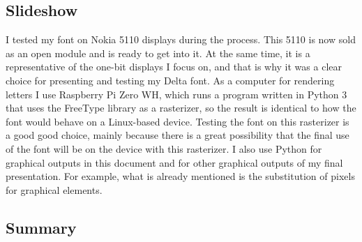 \documentclass[a4paper]{article}
\begin{document}
\subsection{Slideshow}
I tested my font on Nokia 5110 displays during the process. This 5110 is now sold as an open module and is ready to get into it. At the same time, it is a representative of the one-bit displays I focus on, and that is why it was a clear choice for presenting and testing my Delta font. As a computer for rendering letters I use Raspberry Pi Zero WH, which runs a program written in Python 3 that uses the FreeType library as a rasterizer, so the result is identical to how the font would behave on a Linux-based device. Testing the font on this rasterizer is a good good choice, mainly because there is a great possibility that the final use of the font will be on the device with this rasterizer. I also use Python for graphical outputs in this document and for other graphical outputs of my final presentation. For example, what is already mentioned is the substitution of pixels for graphical elements.
\subsection{Summary}
\end{document}

